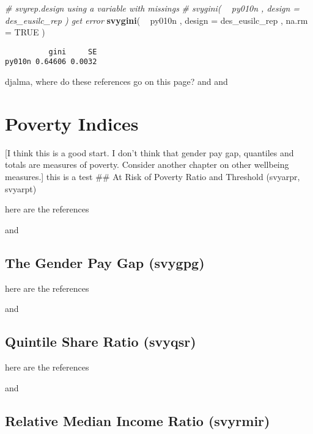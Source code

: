 \documentclass[]{book}
\newenvironment{Shaded}{\begin{snugshade}}{\end{snugshade}}
\newcommand{\KeywordTok}[1]{\textcolor[rgb]{0.13,0.29,0.53}{\textbf{{#1}}}}
\newcommand{\DataTypeTok}[1]{\textcolor[rgb]{0.13,0.29,0.53}{{#1}}}
\newcommand{\StringTok}[1]{\textcolor[rgb]{0.31,0.60,0.02}{{#1}}}
\newcommand{\CommentTok}[1]{\textcolor[rgb]{0.56,0.35,0.01}{\textit{{#1}}}}
\newcommand{\OtherTok}[1]{\textcolor[rgb]{0.56,0.35,0.01}{{#1}}}
\newcommand{\NormalTok}[1]{{#1}}
\begin{document}
\begin{Shaded}
\begin{Highlighting}[]
\CommentTok{# svyrep.design using a variable with missings}
\CommentTok{# svygini( ~ py010n , design = des_eusilc_rep ) get error}
\KeywordTok{svygini}\NormalTok{( ~}\StringTok{ }\NormalTok{py010n , }\DataTypeTok{design =} \NormalTok{des_eusilc_rep , }\DataTypeTok{na.rm =} \OtherTok{TRUE} \NormalTok{)}
\end{Highlighting}
\end{Shaded}

\begin{verbatim}
          gini     SE
py010n 0.64606 0.0032
\end{verbatim}

djalma, where do these references go on this page? \citep{berger2003}
and \citep{osier2009} and \citep{deville1999}

\chapter{Poverty Indices}\label{poverty}

{[}I think this is a good start. I don't think that gender pay gap,
quantiles and totals are measures of poverty. Consider another chapter
on other wellbeing measures.{]} this is a test \#\# At Risk of Poverty
Ratio and Threshold (svyarpr, svyarpt)

here are the references

\citep{osier2009} and \citep{deville1999}

\section{The Gender Pay Gap (svygpg)}\label{the-gender-pay-gap-svygpg}

here are the references

\citep{osier2009} and \citep{deville1999}

\section{Quintile Share Ratio
(svyqsr)}\label{quintile-share-ratio-svyqsr}

here are the references

\citep{osier2009} and \citep{deville1999}

\section{Relative Median Income Ratio
(svyrmir)}\label{relative-median-income-ratio-svyrmir}
\end{document}
